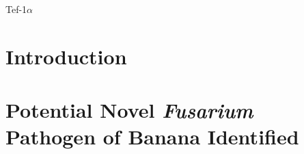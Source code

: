 \documentclass[11pt,a4paper]{report}
\begin{document}


\clearpage
\tableofcontents                     
\listoftables                     
\listoffigures                    
\begin{thesisacknowledgments}        
       
\end{thesisacknowledgments}

\begin{thesisdeclaration}       
 
\end{thesisdeclaration}

\begin{thesisabstract}              
  \begin{singlespace}    
          
 \end{singlespace}
\end{thesisabstract}

\begin{thesisabbreviations}      
         
\end{thesisabbreviations}

\renewcommand{\arraystretch}{1.5} %
\newcommand{\Focub}{\textit{Fusarium oxysporum} f. sp. \textit{cubense} }
\newcommand{\Fo}{\textit{Fusarium oxysporum }}
\newcommand{\Foxy}{\textit{Fusarium oxysporum }}
\newcommand{\Foc}{\textit{Foc }}
\newcommand{\et}{\textit{et al., }}
\newcommand{\Tef}\textit{Tef-1\(\alpha\) } 

\chapter{Introduction}
 
\chapter{Potential Novel \textit{Fusarium} Pathogen of Banana Identified }
 
\end{document}
